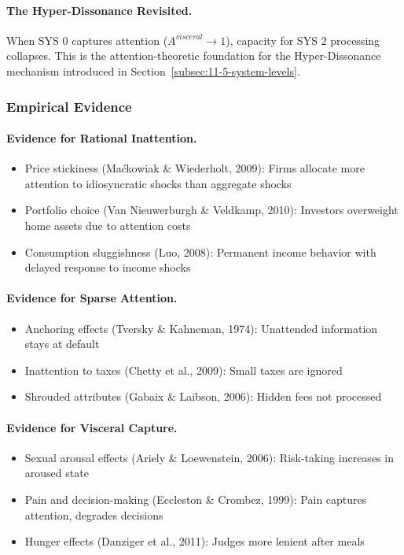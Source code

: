 \paragraph{The Hyper-Dissonance Revisited.}
When SYS 0 captures attention ($A^{visceral} \rightarrow 1$), capacity for 
SYS 2 processing collapses. This is the attention-theoretic foundation 
for the Hyper-Dissonance mechanism introduced in 
Section~\ref{subsec:11-5-system-levels}.

\subsubsection{Empirical Evidence}
\label{subsubsec:empirical-evidence}

\paragraph{Evidence for Rational Inattention.}
\begin{itemize}
\item Price stickiness (Maćkowiak \& Wiederholt, 2009): Firms allocate more 
      attention to idiosyncratic shocks than aggregate shocks
\item Portfolio choice (Van Nieuwerburgh \& Veldkamp, 2010): Investors 
      overweight home assets due to attention costs
\item Consumption sluggishness (Luo, 2008): Permanent income behavior with 
      delayed response to income shocks
\end{itemize}

\paragraph{Evidence for Sparse Attention.}
\begin{itemize}
\item Anchoring effects (Tversky \& Kahneman, 1974): Unattended information 
      stays at default
\item Inattention to taxes (Chetty et al., 2009): Small taxes are ignored
\item Shrouded attributes (Gabaix \& Laibson, 2006): Hidden fees not processed
\end{itemize}

\paragraph{Evidence for Visceral Capture.}
\begin{itemize}
\item Sexual arousal effects (Ariely \& Loewenstein, 2006): Risk-taking 
      increases in aroused state
\item Pain and decision-making (Eccleston \& Crombez, 1999): Pain captures 
      attention, degrades decisions
\item Hunger effects (Danziger et al., 2011): Judges more lenient after meals
\end{itemize}

